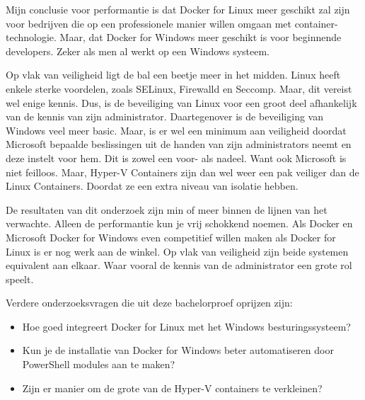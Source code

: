 Mijn conclusie voor performantie is dat Docker for Linux meer geschikt zal zijn voor bedrijven die op een professionele manier willen omgaan met container-technologie. Maar, dat Docker for Windows meer geschikt is voor beginnende developers. Zeker als men al werkt op een Windows systeem.

Op vlak van veiligheid ligt de bal een beetje meer in het midden. Linux heeft enkele sterke voordelen, zoals SELinux, Firewalld en Seccomp. Maar, dit vereist wel enige kennis. Dus, is de beveiliging van Linux voor een groot deel afhankelijk van de kennis van zijn administrator. Daartegenover is de beveiliging van Windows veel meer basic. Maar, is er wel een minimum aan veiligheid doordat Microsoft bepaalde beslissingen uit de handen van zijn administrators neemt en deze instelt voor hem. Dit is zowel een voor- als nadeel. Want ook Microsoft is niet feilloos. Maar, Hyper-V Containers zijn dan wel weer een pak veiliger dan de Linux Containers. Doordat ze een extra niveau van isolatie hebben.

De resultaten van dit onderzoek zijn min of meer binnen de lijnen van het verwachte. Alleen de performantie kun je vrij schokkend noemen. Als Docker en Microsoft Docker for Windows even competitief willen maken als Docker for Linux is er nog werk aan de winkel. Op vlak van veiligheid zijn beide systemen equivalent aan elkaar. Waar vooral de kennis van de administrator een grote rol speelt.

Verdere onderzoeksvragen die uit deze bachelorproef oprijzen zijn:
\begin{itemize}[noitemsep]
	\item Hoe goed integreert Docker for Linux met het Windows besturingssysteem?
	\item Kun je de installatie van Docker for Windows beter automatiseren door PowerShell modules aan te maken?
	\item Zijn er manier om de grote van de Hyper-V containers te verkleinen?
\end{itemize}
